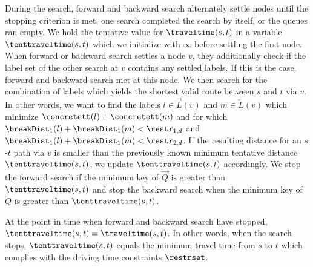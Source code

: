 During the search, forward and backward search alternately settle nodes until the stopping criterion is met, one search completed the search by itself, or the queues ran empty. We hold the tentative value for $\traveltime(s,t)$ in a variable $\tenttraveltime(s,t)$ which we initialize with $\infty$ before settling the first node. When forward or backward search settles a node $v$, they additionally check if the label set of the other search at $v$ contains any settled labels. If this is the case, forward and backward search met at this node. We then search for the combination of labels which yields the shortest valid route between $s$ and $t$ via $v$. In other words, we want to find the labels $l \in \overrightarrow{L}(v)$ and $m \in \overleftarrow{L}(v)$ which minimize $\concretett(l) + \concretett(m)$ and for which $\breakDist_1(l) + \breakDist_1(m) < \restr_{1,d}$ and $\breakDist_1(l) + \breakDist_1(m) < \restr_{2,d}$. If the resulting distance for an $s$-$t$ path via $v$ is smaller than the previously known minimum tentative distance $\tenttraveltime(s,t)$, we update $\tenttraveltime(s,t)$ accordingly. We stop the forward search if the minimum key of $\overrightarrow{Q}$ is greater than $\tenttraveltime(s,t)$ and stop the backward search when the minimum key of $\overleftarrow{Q}$ is greater than $\tenttraveltime(s,t)$.

\begin{theorem}
	At the point in time when forward and backward search have stopped, $\tenttraveltime(s,t) = \traveltime(s,t)$. In other words, when the search stops, $\tenttraveltime(s,t)$ equals the minimum travel time from $s$ to $t$ which complies with the driving time constraints $\restrset$.
\end{theorem}

